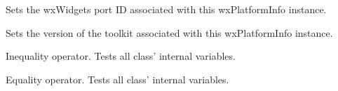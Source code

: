 \label{wxplatforminfosetportid}


Sets the wxWidgets port ID associated with this wxPlatformInfo instance.



\label{wxplatforminfosettoolkitversion}


Sets the version of the toolkit associated with this wxPlatformInfo instance.



\label{wxplatforminfooperatorunknown}


Inequality operator. Tests all class' internal variables.


\label{wxplatforminfooperatorequal}


Equality operator. Tests all class' internal variables.

